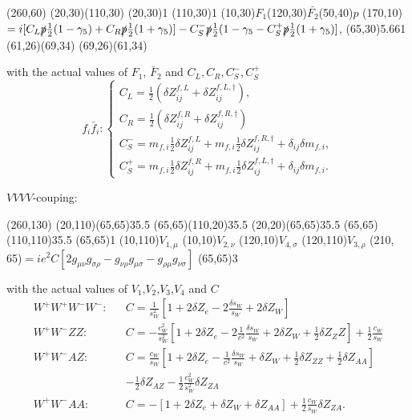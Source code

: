 \begin{axopicture}(260,60) %
	\Line(20,30)(110,30)
	\Vertex(20,30){1}
	\Vertex(110,30){1}
	\Text(10,30){$F_1$}\Text(120,30){$\bar{F_2}$}\Text(50,40){$p$}
	\Text(170,10){$=i[C_L\slashed{p}\frac{1}{2}(1-\gamma_5)+C_R\slashed{p}\frac{1}{2}(1+\gamma_5)]-C_S^-\slashed{p}\frac{1}{2}(1-\gamma_5-C_S^+\slashed{p}\frac{1}{2}(1+\gamma_5)]$,}
	\GCirc(65,30){5.66}{1}	
	\Line(61,26)(69,34)
	\Line(69,26)(61,34)	 %
	
\end{axopicture}
\newline with the actual values of $F_1$, $\bar{F}_2$ and $C_L, C_R, C_S^-, C_S^+$
\begin{equation}
f_i\bar{f}_i:\begin{cases} 
C_L=\frac{1}{2}(\delta Z^{f,L}_{ij}+\delta Z^{f,L,\dagger}_{ij}),
\\ C_R=\frac{1}{2}(\delta Z^{f,R}_{ij}+\delta Z^{f,R,\dagger}_{ij})
\\
C^-_S=m_{f,i}\frac{1}{2}\delta Z^{f,L}_{ij}+m_{f,i}\frac{1}{2}\delta Z^{f,R,\dagger}_{ij}+\delta_{ij}\delta m_{f,i},\\
C^+_S=m_{f,i}\frac{1}{2}\delta Z^{f,R}_{ij}+m_{f,i}\frac{1}{2}\delta Z^{f,L,\dagger}_{ij}+\delta_{ij}\delta m_{f,i}.
\end{cases}
\end{equation}


$VVVV$-couping:

\begin{axopicture}(260,130) %
	\Photon(20,110)(65,65){3}{5.5}
	\Photon(65,65)(110,20){3}{5.5}
	\Photon(20,20)(65,65){3}{5.5}
	\Photon(65,65)(110,110){3}{5.5}
	\Vertex(65,65){1}		
	\Text(10,110){$V_{1,\mu}$}
	\Text(10,10){$V_{2,\nu}$}
	\Text(120,10){$V_{4,\sigma}$}
	\Text(120,110){$V_{3,\rho}$}
	\Text(210, 65){$=ie^2C[2g_{\mu\nu}g_{\sigma\rho}-g_{\nu\rho}g_{\mu\sigma}-g_{\rho\mu}g_{\nu\sigma}]$}
	\Vertex(65,65){3}
\end{axopicture}
\newline with the actual values of $V_1$,$V_2$,$V_3$,$V_4$ and $C$
\begin{eqnarray}
W^+W^+W^-W^-:&& C=\frac{1}{s_W^2}\left[1+2\delta Z_e-2\frac{\delta s_W}{s_W}+2\delta Z_W\right]\nonumber\\
W^+W^-ZZ:&& C=-\frac{c_W^2}{s_W^2}\left[1+2\delta Z_e-2\frac{1}{c^2}\frac{\delta s_W}{s_W}+2\delta Z_W+\frac{1}{2}\delta Z_ZZ\right]+\frac{1}{2}\frac{c_W}{s_W}\nonumber\\
W^+W^-AZ:&&C=
\frac{c_W}{s_W}\left[1+2\delta Z_e-\frac{1}{c^2}\frac{\delta s_W}{s_W}+\delta Z_W+\frac{1}{2}\delta Z_{ZZ}+\frac{1}{2}\delta Z_{AA}\right]\nonumber\\
&&-\frac{1}{2}\delta Z_{AZ}
-\frac{1}{2}\frac{c^2_W}{s^2_W}\delta Z_{ZA}\nonumber\\
W^+W^-AA:&&C=-\left[1+2\delta Z_e+\delta Z_W+\delta Z_{AA}\right]+\frac{1}{2}\frac{c_W}{s_W}\delta Z_{ZA}.
\end{eqnarray}

